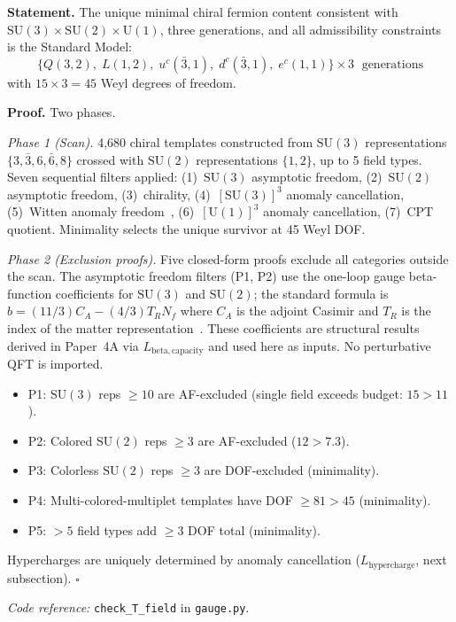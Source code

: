 \documentclass[11pt]{article}
\newenvironment{varlist}{\begin{itemize}[nosep,leftmargin=2em]}{\end{itemize}}
\newcommand{\coderef}[2]{\smallskip\noindent\textit{Code reference:} \texttt{#1} in \texttt{#2}.}
\newcommand{\SU}{\mathrm{SU}}
\newcommand{\U}{\mathrm{U}}
\begin{document}
\begin{tcolorbox}[apfbox, title={Theorem $T_{\mathrm{field}}$ (SM Fermion Content)}]
\textbf{Statement.}  The unique minimal chiral fermion content consistent with $\SU(3) \times \SU(2) \times \U(1)$, three generations, and all admissibility constraints is the Standard Model:
\begin{equation}
\{Q(3,2),\; L(1,2),\; u^c(\bar{3},1),\; d^c(\bar{3},1),\; e^c(1,1)\} \times 3 \;\text{ generations}
\label{eq:fermion_content}
\end{equation}
with $15 \times 3 = 45$ Weyl degrees of freedom.

\smallskip\noindent\textbf{Proof.}  Two phases.

\textit{Phase 1 (Scan).}  4{,}680 chiral templates constructed from $\SU(3)$ representations $\{3, \bar{3}, 6, \bar{6}, 8\}$ crossed with $\SU(2)$ representations $\{1, 2\}$, up to 5 field types.  Seven sequential filters applied: (1)~$\SU(3)$ asymptotic freedom, (2)~$\SU(2)$ asymptotic freedom, (3)~chirality, (4)~$[\SU(3)]^3$ anomaly cancellation, (5)~Witten anomaly freedom~\cite{Witten1982}, (6)~$[\U(1)]^3$ anomaly cancellation, (7)~CPT quotient.  Minimality selects the unique survivor at 45 Weyl DOF.

\textit{Phase 2 (Exclusion proofs).}  Five closed-form proofs exclude all categories outside the scan.  The asymptotic freedom filters (P1, P2) use the one-loop gauge beta-function coefficients for $\SU(3)$ and $\SU(2)$; the standard formula is $b = (11/3)C_A - (4/3)T_R N_f$ where $C_A$ is the adjoint Casimir and $T_R$ is the index of the matter representation~\cite{PeskinSchroeder1995}.  These coefficients are structural results derived in Paper~4A via $L_{\mathrm{beta,capacity}}$ and used here as inputs.  No perturbative QFT is imported.
\begin{varlist}
\item P1: $\SU(3)$ reps $\ge 10$ are AF-excluded (single field exceeds budget: $15 > 11$).
\item P2: Colored $\SU(2)$ reps $\ge 3$ are AF-excluded ($12 > 7.3$).
\item P3: Colorless $\SU(2)$ reps $\ge 3$ are DOF-excluded (minimality).
\item P4: Multi-colored-multiplet templates have DOF $\ge 81 > 45$ (minimality).
\item P5: $> 5$ field types add $\ge 3$ DOF total (minimality).
\end{varlist}

Hypercharges are uniquely determined by anomaly cancellation ($L_{\mathrm{hypercharge}}$, next subsection).  $\square$

\coderef{check\_T\_field}{gauge.py}
\end{tcolorbox}
\end{document}
